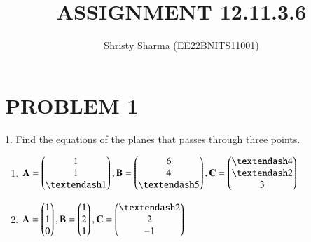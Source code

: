 \documentclass[A4,10pt,twocolumn]{IEEEtran}
\begin{document}
\let\StandardTheFigure\thefigure
\let\vec\mathbf
\renewcommand{\thefigure}{\theproblem}



\def\putbox#1#2#3{\makebox[0in][l]{\makebox[#1][l]{}\raisebox{\baselineskip}[0in][0in]{\raisebox{#2}[0in][0in]{#3}}}}
     \def\rightbox#1{\makebox[0in][r]{#1}}
     \def\centbox#1{\makebox[0in]{#1}}
     \def\topbox#1{\raisebox{-\baselineskip}[0in][0in]{#1}}
     \def\midbox#1{\raisebox{-0.5\baselineskip}[0in][0in]{#1}}



\title{ASSIGNMENT 12.11.3.6}
\author{Shristy Sharma (EE22BNITS11001)}





\maketitle

\newpage


\bigskip

\renewcommand{\thefigure}{\theenumi}
\renewcommand{\thetable}{\theenumi}


%

%
%


\section{PROBLEM 1}
1. Find the equations of the planes that passes through three points.
\begin{enumerate}
\item $\vec{A}= \myvec{1\\1\\– 1}, \vec{B}=\myvec{6\\4\\– 5},\vec{C}= \myvec{– 4\\– 2\\3}$
\item $\vec{A}= \myvec{1\\1\\0}, \vec{B}= \myvec{1\\2\\1}, \vec{C}= \myvec{– 2\\2\\-1}$
\end{enumerate}
\end{document}
